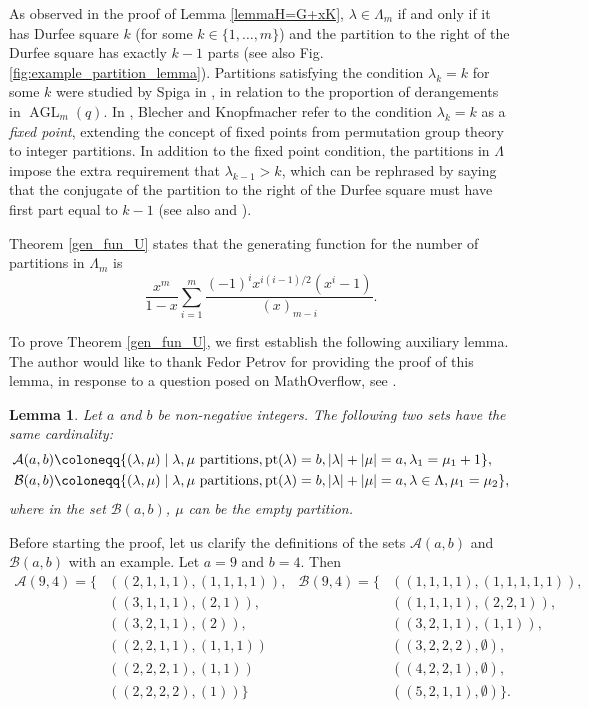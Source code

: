 \documentclass[a4paper, 12pt, oneside]{amsart}
\newtheorem{lemma}[prop]{Lemma}
\theoremstyle{definition}
\newcommand{\pt}{\mathrm{pt}}
\DeclareMathOperator{\AGL}{AGL}
\begin{document}
As observed in the proof of Lemma \ref{lemmaH=G+xK}, $\lambda \in \Lambda_m$ if and only if it has Durfee square $k$ (for some $k \in \{1,\dots,m\}$)  and the partition to the right of the Durfee square has exactly $k-1$ parts (see also Fig. \ref{fig:example_partition_lemma}). Partitions satisfying the condition $\lambda_k=k$ for some $k$ were studied by Spiga in \cite{SpigaAGL}, in relation to the proportion of derangements in $\AGL_m(q)$. In \cite{BlechKnopf}, Blecher and Knopfmacher refer to the condition $\lambda_k=k$ as a \textit{fixed point}, extending the concept of fixed points from permutation group theory to integer partitions. In addition to the fixed point condition, the partitions in $\Lambda$ impose the extra requirement that $\lambda_{k-1}>k$, which can be rephrased by saying that the conjugate of the partition to the right of the Durfee square must have first part equal to $k-1$ (see also \cite{HopkSell} and \cite{Hopk}).

Theorem \ref{gen_fun_U} states that the generating function for the number of partitions in $\Lambda_m$ is
$$\frac{x^m}{1-x}\sum_{i=1}^{m}\frac{(-1)^{i}x^{i(i-1)/2}(x^i-1)}{(x)_{m-i}}.$$



To prove Theorem  \ref{gen_fun_U}, we first establish the following auxiliary lemma. The author would like to thank Fedor Petrov for providing the proof of this lemma, in response to a question posed on MathOverflow, see \cite{Fedor}.
\begin{lemma}
\label{|A|=|B|}
Let $a$ and $b$ be non-negative integers. The following two sets have the same cardinality:
\begin{align*}
\mathcal{A}(a,b)\coloneqq&\{(\lambda,\mu) \mid \lambda,\mu \textup{ partitions}, \pt(\lambda)=b, |\lambda|+|\mu|=a, \lambda_1=\mu_1+1\},\\
\mathcal{B}(a,b)\coloneqq&\{(\lambda,\mu) \mid \lambda,\mu \textup{ partitions}, \pt(\lambda)=b, |\lambda|+|\mu|=a, \lambda \in \Lambda, \mu_1=\mu_2 \},
\end{align*}
where in the set $\mathcal{B}(a,b)$,  $\mu$ can be the empty partition.
\end{lemma}

Before starting the proof, let us clarify the definitions of the sets $\mathcal{A}(a,b)$ and $\mathcal{B}(a,b)$ with an example. Let $a=9$ and $b=4$. Then
\begin{align*}
\mathcal{A}(9,4)=\{& ((2,1,1,1),(1,1,1,1)), & \mathcal{B}(9,4)=\{&((1,1,1,1),(1,1,1,1,1)),\\
& ((3,1,1,1),(2,1)), & &((1,1,1,1),(2,2,1)), \\
& ((3,2,1,1),(2)),& &((3,2,1,1),(1,1)), \\
& ((2,2,1,1),(1,1,1)) & & ((3,2,2,2),\emptyset),\\
& ((2,2,2,1),(1,1))& &((4,2,2,1),\emptyset), \\
& ((2,2,2,2),(1))\} & &((5,2,1,1), \emptyset)\}.
\end{align*}
\end{document}
